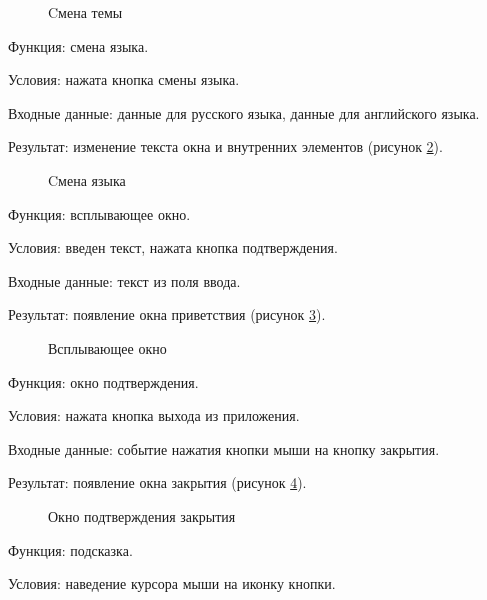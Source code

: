 \begin{figure}[H] %
\caption{Cмена темы}
\label{theme:image}
\end{figure}

Функция: смена языка.

Условия: нажата кнопка смены языка.

Входные данные: данные для русского языка, данные для английского языка.

Результат: изменение текста окна и внутренних элементов (рисунок \ref{lang:image}).

\begin{figure}[H] %
	\caption{Cмена языка}
	\label{lang:image}
\end{figure}

Функция: всплывающее окно.

Условия: введен текст, нажата кнопка подтверждения.

Входные данные: текст из поля ввода.

Результат: появление окна приветствия (рисунок \ref{msg:image}).

\begin{figure}[H] %
	\caption{Всплывающее окно}
	\label{msg:image}
\end{figure}

Функция: окно подтверждения.

Условия: нажата кнопка выхода из приложения.

Входные данные: событие нажатия кнопки мыши на кнопку закрытия.

Результат: появление окна закрытия (рисунок \ref{msg-y-n:image}).

\begin{figure}[H] %
	\caption{Окно подтверждения закрытия}
	\label{msg-y-n:image}
\end{figure}

Функция: подсказка.

Условия: наведение курсора мыши на иконку кнопки.

